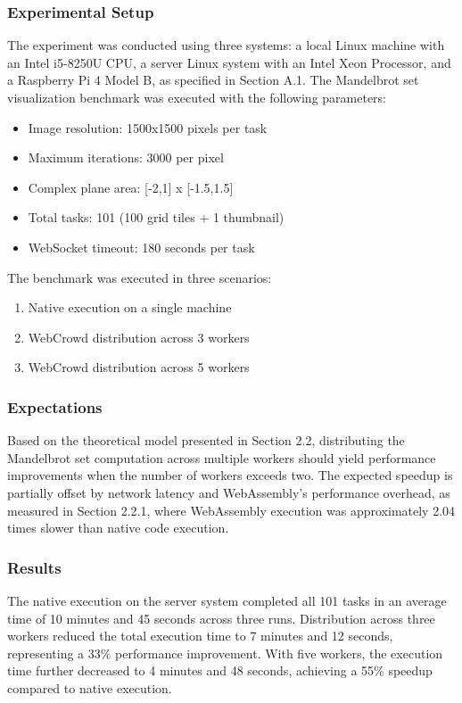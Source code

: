 \subsubsection{Experimental Setup}
The experiment was conducted using three systems: a local Linux machine with an Intel i5-8250U CPU, a server Linux system with an Intel Xeon Processor, and a Raspberry Pi 4 Model B, as specified in Section A.1. The Mandelbrot set visualization benchmark was executed with the following parameters:

\begin{itemize}
\item Image resolution: 1500x1500 pixels per task
\item Maximum iterations: 3000 per pixel
\item Complex plane area: [-2,1] x [-1.5,1.5]
\item Total tasks: 101 (100 grid tiles + 1 thumbnail)
\item WebSocket timeout: 180 seconds per task
\end{itemize}

The benchmark was executed in three scenarios:
\begin{enumerate}
\item Native execution on a single machine
\item WebCrowd distribution across 3 workers
\item WebCrowd distribution across 5 workers
\end{enumerate}

\subsubsection{Expectations}
Based on the theoretical model presented in Section 2.2, distributing the Mandelbrot set computation across multiple workers should yield performance improvements when the number of workers exceeds two. The expected speedup is partially offset by network latency and WebAssembly's performance overhead, as measured in Section 2.2.1, where WebAssembly execution was approximately 2.04 times slower than native code execution.

\subsubsection{Results}
The native execution on the server system completed all 101 tasks in an average time of 10 minutes and 45 seconds across three runs. Distribution across three workers reduced the total execution time to 7 minutes and 12 seconds, representing a 33\% performance improvement. With five workers, the execution time further decreased to 4 minutes and 48 seconds, achieving a 55\% speedup compared to native execution.

